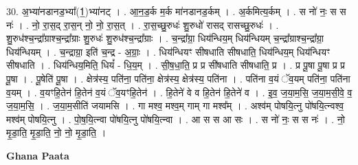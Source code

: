\documentclass[17pt]{extarticle}
\begin{document}
30. अ॒भ्या॑नडानड॒भ्या᳚(1॒)भ्या॑नट् । . आ॒न॒ड॒र्क म॒र्क मा॑नडानड॒र्कम् । . अ॒र्कमित्य॒र्कम् । . स नो॑ नः॒ स स नः॑ । . नो॒ रा॒स॒द् रा॒स॒न् नो॒ नो॒ रा॒स॒त् । . रा॒स॒च्छु॒रुधः॑ शु॒रुधो॑ रासद् रासच्छु॒रुधः॑ । . शु॒रुध॑श्च॒न्द्रा᳚ग्राश्च॒न्द्रा᳚ग्राः शु॒रुधः॑ शु॒रुध॑श्च॒न्द्रा᳚ग्राः । . च॒न्द्रा᳚ग्रा॒ धिय॑न्धिय॒म् धिय॑न्धियम् च॒न्द्रा᳚ग्राश्च॒न्द्रा᳚ग्रा॒ धिय॑न्धियम् । . च॒न्द्राग्रा॒ इति॑ च॒न्द्र - अ॒ग्राः॒ । . धिय॑न्धियꣳ सीषधाति सीषधाति॒ धिय॑न्धिय॒म् धिय॑न्धियꣳ सीषधाति । . धिय॑न्धिय॒मिति॒ धियं᳚ - धि॒य॒म् । . सी॒ष॒धा॒ति॒ प्र प्र सी॑षधाति सीषधाति॒ प्र । . प्र पू॒षा पू॒षा प्र प्र पू॒षा । . पू॒षेति॑ पू॒षा । . क्षेत्र॑स्य॒ पति॑ना॒ पति॑ना॒ क्षेत्र॑स्य॒ क्षेत्र॑स्य॒ पति॑ना । . पति॑ना व॒यं ॅव॒यम् पति॑ना॒ पति॑ना व॒यम् । . व॒यꣳहि॒तेन॑ हि॒तेन॑ व॒यं ॅव॒यꣳहि॒तेन॑ । . हि॒तेने॑ वे व हि॒तेन॑ हि॒तेने॑ व । . इ॒व॒ ज॒या॒म॒सि॒ ज॒या॒म॒सी॒वे॒ व॒ ज॒या॒म॒सि॒ । . ज॒या॒म॒सीति॑ जयामसि । . गा मश्व॒ मश्व॒म् गाम् गा मश्व᳚म् । . अश्व॑म् पोषयि॒त्नु पो॑षयि॒त्न्वश्व॒ मश्व॑म् पोषयि॒त्नु । . पो॒ष॒यि॒त्न्वा पो॑षयि॒त्नु पो॑षयि॒त्न्वा । . आ स स आ सः । . स नो॑ नः॒ स स नः॑ । . नो॒ मृ॒डा॒ति॒ मृ॒डा॒ति॒ नो॒ नो॒ मृ॒डा॒ति॒ । \newline

\textbf{Ghana Paata } \newline
\end{document}

